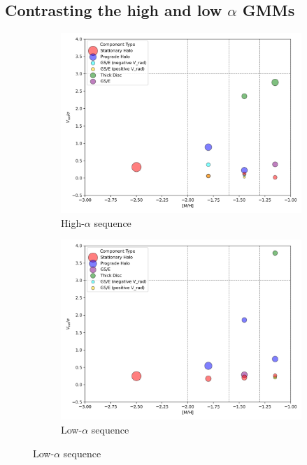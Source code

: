 \documentclass[a4paper,12pt]{article}
\begin{document}
\subsection{\texorpdfstring{Contrasting the high and low $\alpha$ GMMs}{Contrasting the high/low–alpha GMMs}}
\label{subsec:gmm_comparison}

\begin{figure}[H]
  \centering
  \begin{subfigure}{0.48\linewidth}
    \includegraphics[width=\linewidth]{../figures/v_over_sigma_per_component_highalpha.png}
    \caption{High-$\alpha$ sequence}
    \label{fig:v_over_sigma_high}
  \end{subfigure}
  \hfill
  \begin{subfigure}{0.48\linewidth}
    \includegraphics[width=\linewidth]{../figures/v_over_sigma_per_component_lowalpha.png}
    \caption{Low-$\alpha$ sequence}
    \label{fig:v_over_sigma_low}
  \end{subfigure}


\end{figure}
\end{document}
